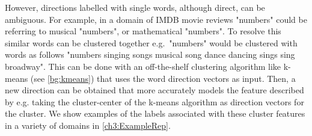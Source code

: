 However, directions labelled with single words, although direct, can be ambiguous. For example, in a domain of IMDB movie reviews "numbers" could be referring to musical "numbers", or mathematical "numbers".  To resolve this  similar words can be clustered together e.g.\  "numbers" would be clustered with words as follows  "numbers singing songs musical song dance dancing sings sing broadway". This can be done with an off-the-shelf clustering algorithm like k-means (see \ref{bg:kmeans}) that uses the word direction vectors as input. Then, a new direction can be obtained that more accurately models the feature described by e.g. taking the cluster-center of the k-means algorithm as  direction vectors for the cluster.  We show examples of the labels associated with these cluster features  in a variety of domains in \ref{ch3:ExampleRep}. 
 
